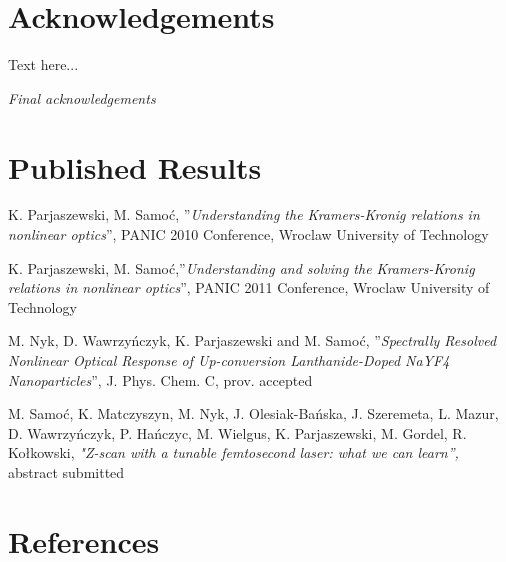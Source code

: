 \documentclass[12pt,twoside,a4paper]{article}
\def\emptyline{\vspace{12pt}}
\numberwithin{equation}{subsection}
\numberwithin{figure}{subsection}
\begin{document}
\section{Acknowledgements} \label{chap:acknowledgements}

Text here... 

\textit{Final acknowledgements}

\section{Published Results} \label{chap:published_results}

K. Parjaszewski, M. Samoć, ''\textit{Understanding the Kramers-Kronig
relations in nonlinear optics}'', PANIC 2010 Conference, Wroclaw
University of Technology

\emptyline

K. Parjaszewski, M. Samoć,''\textit{Understanding and solving the
Kramers-Kronig relations in nonlinear optics}'', PANIC 2011 Conference,
Wroclaw University of Technology

\emptyline

M. Nyk, D. Wawrzyńczyk, K. Parjaszewski and M. Samoć,
''\textit{Spectrally Resolved Nonlinear Optical Response of
Up-conversion Lanthanide-Doped NaYF4 Nanoparticles}'', J. Phys. Chem.
C, prov. accepted 

\emptyline

M. Samoć, K. Matczyszyn, M. Nyk, J. Olesiak-Bańska, J. Szeremeta, L.
Mazur, D. Wawrzyńczyk, P. Hańczyc, M. Wielgus, K. Parjaszewski, M.
Gordel, R. Kołkowski, \textit{"Z-scan with a tunable femtosecond
laser: what we can learn'', }abstract submitted


\section{References}
\nocite{*}


\end{document}
